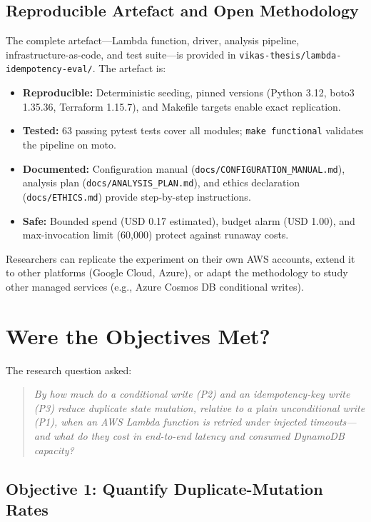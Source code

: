 \subsection{Reproducible Artefact and Open Methodology}

The complete artefact---Lambda function, driver, analysis pipeline, infrastructure-as-code, and test suite---is provided in \texttt{vikas-thesis/lambda-idempotency-eval/}. The artefact is:

\begin{itemize}
    \item \textbf{Reproducible:} Deterministic seeding, pinned versions (Python 3.12, boto3 1.35.36, Terraform 1.15.7), and Makefile targets enable exact replication.
    \item \textbf{Tested:} 63 passing pytest tests cover all modules; \texttt{make functional} validates the pipeline on moto.
    \item \textbf{Documented:} Configuration manual (\texttt{docs/CONFIGURATION\_MANUAL.md}), analysis plan (\texttt{docs/ANALYSIS\_PLAN.md}), and ethics declaration (\texttt{docs/ETHICS.md}) provide step-by-step instructions.
    \item \textbf{Safe:} Bounded spend (USD 0.17 estimated), budget alarm (USD 1.00), and max-invocation limit (60,000) protect against runaway costs.
\end{itemize}

Researchers can replicate the experiment on their own AWS accounts, extend it to other platforms (Google Cloud, Azure), or adapt the methodology to study other managed services (e.g., Azure Cosmos DB conditional writes).

\section{Were the Objectives Met?}

The research question asked:

\begin{quote}
\textit{By how much do a conditional write (P2) and an idempotency-key write (P3) reduce duplicate state mutation, relative to a plain unconditional write (P1), when an AWS Lambda function is retried under injected timeouts---and what do they cost in end-to-end latency and consumed DynamoDB capacity?}
\end{quote}

\subsection{Objective 1: Quantify Duplicate-Mutation Rates}

